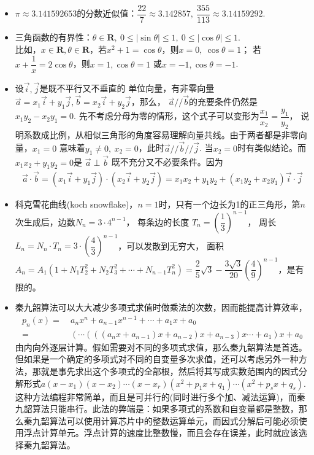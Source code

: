 \begin{itemize}[leftmargin=\inteval{\myitemleftmargin}pt,itemsep=
   \inteval{\myitemitempsep}pt,topsep=\inteval{\myitemtopsep}pt]
\item $ \pi\approx 3.141592653 $的分数近似值：$ \dfrac{22}{7} 
\approx 3.142857,\ \dfrac{355}{113}\approx 3.14159292 $. 

\item 三角函数的有界性：$ \theta\in\textbf{R},\ 0\leq |\sin \theta|
\leq 1,\ 0\leq |\cos \theta|\leq 1 $.\\ 比如，$ x\in \textbf{R},\theta 
\in \textbf{R} $，若$ x^2+1=\cos\theta $，则$ x=0,\ \cos\theta=1 $；
若$ x+\dfrac{1}{x}=2\cos\theta $，则$ x=1,\cos\theta=1 $
或$ x=-1,\cos\theta=-1 $. 

\item 设$ \vec{i},\vec{j} $是既不平行又不垂直的
单位向量，有非零向量$ \vec{a}=x_1\vec{i}+y_1\vec{j},
\vec{b}=x_2\vec{i}+y_2\vec{j} $，那么，
$ \vec{a}//\vec{b} $的充要条件仍然是$ x_1y_2-x_2y_1=0 $. 
先不考虑分母为零的情形，这个式子可以变形为$ \dfrac{x_1}{x_2}=\dfrac{y_1}{y_2} $，
说明系数成比例，从相似三角形的角度容易理解向量共线。由于两者都是非零向量，$ x_1=0 $
意味着$ y_1\neq 0,\ x_2=0 $，此时$ \vec{a}//\vec{b}//
\vec{j} $. 当$ x_2=0 $时有类似结论。而$ x_1x_2+y_1y_2=0 $是
$ \vec{a}\perp\vec{b} $
既不充分又不必要条件。因为
\begin{gather*}
    \vec{a}\cdot\vec{b}=(x_1\vec{i}+
    y_1\vec{j})\cdot(x_2\vec{i}+y_2\vec{j})
    =x_1x_2+y_1y_2+(x_1y_2+x_2y_1)\vec{i}\cdot \vec{j}
\end{gather*}

\item 科克雪花曲线(koch snowflake)，$ n=1 $时，只有一个边长为1的正三角形，第$ n $次生成后，边数$ N_n=3 \cdot 4^{n-1} $，
每条边的长度 $ T_n=\left(\dfrac{1}{3} \right)^{n-1}  $，
周长$ L_n=N_n \cdot T_n=3\cdot \left( \dfrac{4}{3}\right)^{n-1}  $，可以发散到无穷大，
面积$ A_n =A_1(1+N_1 T_2^2+N_2T_3^2+\cdots +N_{n-1}T_n^2)
=\dfrac{2}{5}\sqrt{3}-\dfrac{3\sqrt{3}}{20}\left(\dfrac{4}{9} \right)^{n-1}  $，是有限的。

\item 秦九韶算法可以大大减少多项式求值时做乘法的次数，因而能提高计算效率，
\begin{align*}
    p_n(x) =&\ a_nx^n+a_{n-1}x^{n-1}+\cdots + a_1x+a_0 \\
    =&\ (\cdots (((a_nx+a_{n-1})x+a_{n-2})x+a_{n-3})x\cdots +a_1)x+a_0
\end{align*}	
由内向外逐层计算。假如需要对不同的多项式求值，那么秦九韶算法是首选。但如果是一个确定的多项式对不同的自变量多次求值，还可以考虑另外一种方法，那就是事先求出这个多项式的全部根，然后将其写成实数范围内的因式分解形式$ a(x-x_1)(x-x_2)\cdots (x-x_r)(x^2+p_1x+q_1)\cdots(x^2+p_sx+q_s) $. 这种方法编程非常简单，而且是可并行的(同时进行多个加、减法运算)，而秦九韶算法只能串行。此法的弊端是：如果多项式的系数和自变量都是整数，那么秦九韶算法可以使用计算芯片中的整数运算单元，而因式分解后可能必须使用浮点计算单元。浮点计算的速度比整数慢，而且会存在误差，此时就应该选择秦九韶算法。


\end{itemize}
